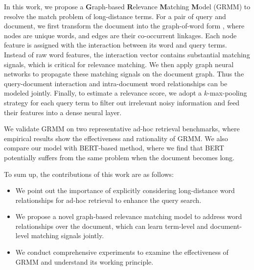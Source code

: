 In this work, we propose a \textbf{G}raph-based \textbf{R}elevance \textbf{M}atching \textbf{M}odel (GRMM) to resolve the match problem of long-distance terms. For a pair of query and document, we first transform the document into the graph-of-word form \cite{rousseau2015text}, where nodes are unique words, and edges are their co-occurrent linkages. Each node feature is assigned with the interaction between its word and query terms. Instead of raw word features, the interaction vector contains substantial matching signals, which is critical for relevance matching. We then apply graph neural networks to propagate these matching signals on the document graph. Thus the query-document interaction and intra-document word relationships can be modeled jointly. Finally, to estimate a relevance score, we adopt a $k$-max-pooling strategy for each query term to filter out irrelevant noisy information and feed their features into a dense neural layer.

We validate GRMM on two representative ad-hoc retrieval benchmarks, where empirical results show the effectiveness and rationality of GRMM. We also compare our model with BERT-based method, where we find that BERT potentially suffers from the same problem when the document becomes long. 

To sum up, the contributions of this work are as follows:
\begin{itemize}
	\item We point out the importance of explicitly considering long-distance word relationships for ad-hoc retrieval to enhance the query search.
	\item We propose a novel graph-based relevance matching model to address word relationships over the document, which can learn term-level and document-level matching signals jointly.
	\item We conduct comprehensive experiments to examine the effectiveness of GRMM and understand its working principle.
\end{itemize}